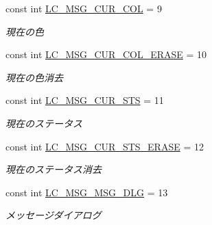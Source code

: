 \begin{DoxyCompactItemize}
\mbox{\label{class_reversi_wpf_1_1_reversi_const_af38e0954b8b86a86641a06fa60a05184}} 
const int \hyperlink{class_reversi_wpf_1_1_reversi_const_af38e0954b8b86a86641a06fa60a05184}{L\+C\+\_\+\+M\+S\+G\+\_\+\+C\+U\+R\+\_\+\+C\+OL} = 9
\begin{DoxyCompactList}\small\item\em 現在の色 \end{DoxyCompactList}\item 
\mbox{\label{class_reversi_wpf_1_1_reversi_const_aaf67fd223238ea78b76d44b0611c499a}} 
const int \hyperlink{class_reversi_wpf_1_1_reversi_const_aaf67fd223238ea78b76d44b0611c499a}{L\+C\+\_\+\+M\+S\+G\+\_\+\+C\+U\+R\+\_\+\+C\+O\+L\+\_\+\+E\+R\+A\+SE} = 10
\begin{DoxyCompactList}\small\item\em 現在の色消去 \end{DoxyCompactList}\item 
\mbox{\label{class_reversi_wpf_1_1_reversi_const_a5ef1e1c730e015fcce31283d48a41433}} 
const int \hyperlink{class_reversi_wpf_1_1_reversi_const_a5ef1e1c730e015fcce31283d48a41433}{L\+C\+\_\+\+M\+S\+G\+\_\+\+C\+U\+R\+\_\+\+S\+TS} = 11
\begin{DoxyCompactList}\small\item\em 現在のステータス \end{DoxyCompactList}\item 
\mbox{\label{class_reversi_wpf_1_1_reversi_const_ae2b8d6cab47195c225fbde8293f27563}} 
const int \hyperlink{class_reversi_wpf_1_1_reversi_const_ae2b8d6cab47195c225fbde8293f27563}{L\+C\+\_\+\+M\+S\+G\+\_\+\+C\+U\+R\+\_\+\+S\+T\+S\+\_\+\+E\+R\+A\+SE} = 12
\begin{DoxyCompactList}\small\item\em 現在のステータス消去 \end{DoxyCompactList}\item 
\mbox{\label{class_reversi_wpf_1_1_reversi_const_aa7d952a94bb0c56560c6c3f83a0b36c9}} 
const int \hyperlink{class_reversi_wpf_1_1_reversi_const_aa7d952a94bb0c56560c6c3f83a0b36c9}{L\+C\+\_\+\+M\+S\+G\+\_\+\+M\+S\+G\+\_\+\+D\+LG} = 13
\begin{DoxyCompactList}\small\item\em メッセージダイアログ \end{DoxyCompactList}\item 

\end{DoxyCompactItemize}
